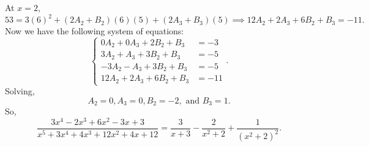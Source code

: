 At $x=2$,
\begin{equation*}
	53 = 3(6)^2 + (2A_2+B_2)(6)(5) + (2A_3+B_3)(5) \implies 12A_2 + 2A_3 + 6B_2 + B_3 = -11.
\end{equation*}
Now we have the following system of equations:
\begin{equation*}
	\begin{cases}
		0A_2  + 0A_3 + 2B_2 + B_3 &= -3 \\
		3A_2  + A_3  + 3B_2 + B_3 &= -5 \\
		-3A_2 - A_3  + 3B_2 + B_3 &= -5 \\
		12A_2 + 2A_3 + 6B_2 + B_3 &= -11
	\end{cases}.
\end{equation*}
Solving,
\begin{equation*}
	A_2 = 0, A_3 = 0, B_2 = -2, \text{ and } B_3 = 1.
\end{equation*}
So,
\begin{equation*}
	\frac{3x^4-2x^3+6x^2-3x+3}{x^5+3x^4+4x^3+12x^2+4x+12} = \frac{3}{x+3}-\frac{2}{x^2+2}+\frac{1}{(x^2+2)^2}.
\end{equation*}